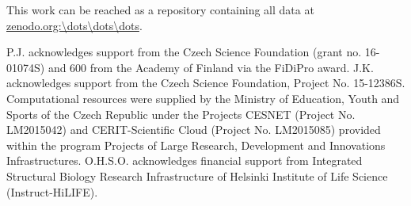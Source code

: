 \documentclass[aip,jcp,twocolumn]{revtex4}
\begin{document}




This work can be reached as a repository containing all data at \url{zenodo.org:\dots\dots\dots}.



\begin{acknowledgments}
P.J. acknowledges support from the Czech Science Foundation (grant no. 16-01074S) 
and 600 from the Academy of Finland via the FiDiPro award.
J.K. acknowledges support from the Czech Science Foundation, Project No. 15-12386S.
Computational resources were supplied by the Ministry of Education, Youth and Sports
of the Czech Republic under the Projects CESNET (Project No. LM2015042) and CERIT-Scientific
Cloud (Project No. LM2015085) provided within the program Projects of Large Research,
Development and Innovations Infrastructures.
O.H.S.O. acknowledges financial support from
Integrated Structural Biology Research Infrastructure of
Helsinki Institute of Life Science (Instruct-HiLIFE).
\end{acknowledgments}




\listoftodos
\end{document}
